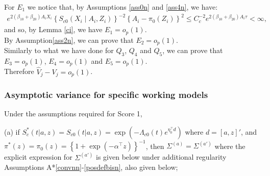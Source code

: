 \documentclass[11pt]{article}
\newcommand{\eqnn}{\begin{eqnarray*}}
\newcommand{\een}{\end{eqnarray*}}
\begin{document}
For $E_1$ we notice that, by Assumptions \ref{ass0n} and \ref{ass4n}, we have:
\eqnn
e^{2(\beta_{10}+ \beta_{20})A_i X_i} \left\{S_{c0}(X_i \mid A_i,Z_i)\right\}^{-2}\left\{A_i-\pi_0(Z_i)\right\}^2\leq C_c^{-2} e^{2(\beta_{10}+ \beta_{20})A_i \tau}<\infty,
\een
and so, by Lemma \ref{ci}, we have $E_1=o_p(1)$.\\
By Assumption\ref{ass2n}, we can prove that $E_2=o_p(1)$.\\
Similarly to what we have done for $Q_3$, $Q_4$ and $Q_5$, we can prove that $E_3=o_p(1)$, $E_4=o_p(1)$ and $E_5=o_p(1)$.\\
Therefore $\hat V_j-V_j=o_p(1)$.





\newpage
\subsubsection{Asymptotic variance for specific working models} %

Under the  assumptions required for  Score 1, 

(a) if $S^{*}_c(t | a,z)=S_{c0}(t | a,z)=\exp\left(-\Lambda_{c0}(t)e^{\eta^\top_0 d}\right)$ where $d=[a, z]'$, and $\pi^{*}(z)=\pi_0(z)=\left\{1+\exp(-\alpha^\top z)\right\}^{-1}$, 
then $ \Sigma^{(a)} =  \Sigma^{(a')}$ where the explicit expression for $ \Sigma^{(a')}$ is given below under additional regularity Assumptions  A*\ref{convnn}-\ref{posdefbisn}, also given below;
\end{document}
